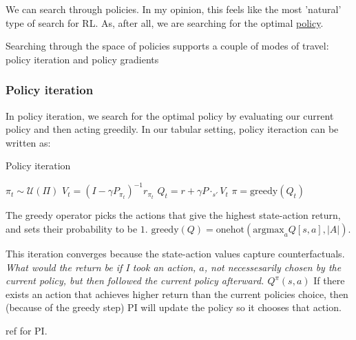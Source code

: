 We can search through policies. In my opinion, this feels like the most 'natural' type of search for RL.
As, after all, we are searching for the optimal \underline{policy}.

Searching through the space of policies supports a couple of modes of travel:
policy iteration and policy gradients

\subsubsection{Policy iteration}

In policy iteration, we search for the optimal policy by evaluating our current
policy and then acting greedily. In our tabular setting, policy iteraction can be written as:

\begin{algorithm}
\caption{Policy iteration}
\begin{algorithmic}[1]

    \State $\pi_t \sim \mathcal U(\Pi)$
      \State $V_t = (I-\gamma P_{\pi_t})^{-1} r_{\pi_t}$ 
      \State $Q_t =  r + \gamma P\cdot_{s'} V_t$ 
      \State $\pi = \text{greedy}(Q_t) $ 
    \EndWhile
    \State \algorithmicreturn{ $\pi$}
\EndProcedure

\end{algorithmic}
\end{algorithm}

The greedy operator picks the actions that give the highest state-action return,
and sets their probability to be $1$.
$\text{greedy}(Q) = \text{onehot}(\text{argmax}_a Q[s, a], |A|)$.

This iteration converges because the state-action values capture counterfactuals.
\textit{What would the return be if I took an action, $a$, not necessesarily chosen by
the current policy, but then followed the current policy afterward. $Q^{\pi}(s, a)$}
If there exists an action that achieves higher return than the current policies choice,
then (because of the greedy step) PI will update the policy so it chooses that action.

\footnotemark[7]


{\color{red}ref for PI.}

